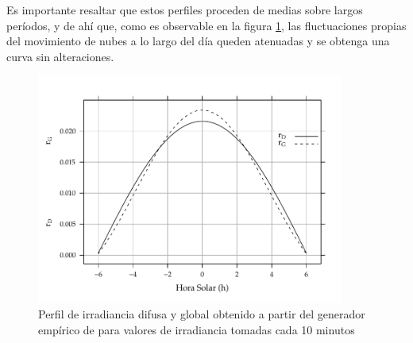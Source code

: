 Es importante resaltar que estos perfiles proceden de medias sobre largos períodos, y de ahí que, como es observable en la figura \ref{fig:org28b2399}, las fluctuaciones propias del movimiento de nubes a lo largo del día queden atenuadas y se obtenga una curva sin alteraciones.
\begin{figure}[h]
\centering
\includegraphics[keepaspectratio,width=0.9\textwidth,height=0.5\textheight]{figuras/RgRd.pdf}
\caption{\label{fig:org28b2399}Perfil de irradiancia difusa y global obtenido a partir del generador empírico de \cite{Collares-Pereira.Rabl1979} para valores de irradiancia tomadas cada 10 minutos}
\end{figure}

